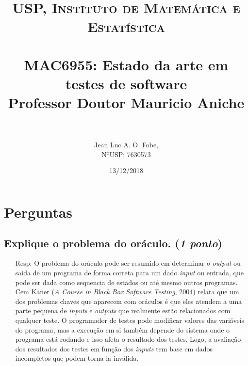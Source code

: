 \documentclass[paper=a4, fontsize=11pt]{scrartcl} %
\title{	
\normalfont \normalsize 
\textsc{USP, Instituto de Matemática e Estatística} \\ [25pt] %
\horrule{0.5pt} \\[0.4cm] %
\huge MAC6955: Estado da arte em testes de software \\ %
\normalfont \normalsize 
Professor Doutor Mauricio Aniche \\ [25pt]
\horrule{2pt} \\[0.5cm] %
}
\author{Jean Luc A. O. Fobe, \\
        NºUSP: 7630573} %
\date{13/12/2018} %
\numberwithin{equation}{section} %
\numberwithin{figure}{section} %
\numberwithin{table}{section} %
\begin{document}
\maketitle %

\section{Perguntas}
\subsection{Explique o problema do oráculo. (\textit{1 ponto})}
\begin{itemize}
    \item[Resp:] O problema do oráculo pode ser resumido em determinar o \textit{output} ou saída de um programa de forma correta para um dado \textit{input} ou entrada, que pode ser dada como sequencia de estados ou até mesmo outros programas.\\
    Cem Kaner (\textit{A Course in Black Box Software Testing}, 2004) relata que um dos problemas chaves que aparecem com oráculos é que eles atendem a uma parte pequena de \textit{inputs} e \textit{outputs} que realmente estão relacionados com qualquer teste. O programador de testes pode modificar valores das variáveis do programa, mas a execução em si também depende do sistema onde o programa está rodando e isso afeta o resultado dos testes. Logo, a avaliação dos resultados dos testes em função dos \textit{inputs} tem base em dados incompletos que podem torna-la inválida.
\end{itemize}
\end{document}
